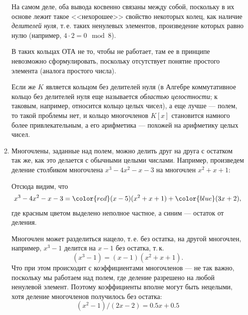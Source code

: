 \begin{enumerate}
На самом деле, оба вывода косвенно связаны между собой, поскольку в их основе лежит такое <<нехорошее>> свойство некоторых колец, как наличие \textit{делителей нуля}, т.\,е. таких ненулевых элементов, произведение которых равно нулю (например, $4\cdot 2=0\mod 8$).

В таких кольцах ОТА не то, чтобы не работает, там ее в принципе невозможно сформулировать, поскольку отсутствует понятие простого элемента (аналога простого числа).

Если же $K$ является кольцом без делителей нуля (в Алгебре коммутативное кольцо без делителей нуля еще называется \textit{областью целостности}; к таковым, например, относится кольцо целых чисел), а еще лучше --- полем, то такой проблемы нет, и кольцо многочленов $K[x]$ становится намного более привлекательным, а его арифметика --- похожей на арифметику целых чисел.




\item Многочлены, заданные над полем, можно делить друг на друга с остатком так же, как это делается с обычными целыми числами. Например, произведем деление столбиком многочлена $x^3-4x^2-x-3$ на многочлен $x^2+x+1$:
\begin{center}
\end{center}
Отсюда видим, что
$$
x^3-4x^2-x-3 = {\color{red}(x-5)}(x^2+x+1) + {\color{blue}(3x+2)},
$$
где красным цветом выделено неполное частное, а синим --- остаток от деления.

Многочлен может разделиться нацело, т.\,е. без остатка, на другой многочлен, например, $x^3-1$ делится на $x-1$ без остатка, т.\,к.
$$
(x^3-1)=(x-1)(x^2+x+1).
$$
Что при этом происходит с коэффициентами многочленов --- не так важно, поскольку мы работаем над полем, где деление разрешено на любой ненулевой элемент. Поэтому коэффициенты вполне могут быть нецелыми, хотя деление многочленов получилось без остатка:
$$
(x^2-1)/(2x-2) = 0.5x+0.5
$$


\end{enumerate}
